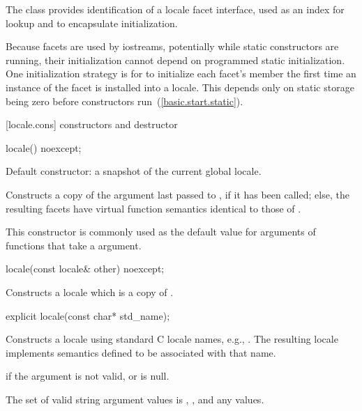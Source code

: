 \pnum
The class  provides identification of a locale facet
interface, used as an index for lookup
and to encapsulate initialization.

\pnum
\begin{note}
Because facets are used by iostreams, potentially while static constructors are
running, their initialization cannot depend on programmed static
initialization.
One initialization strategy is for
to initialize each facet's
member the first time an instance of the facet is installed into a locale.
This depends only on static storage being zero before constructors run~(\ref{basic.start.static}).
\end{note}

[locale.cons]{ constructors and destructor}

%
\begin{itemdecl}
locale() noexcept;
\end{itemdecl}

\begin{itemdescr}
\pnum
Default constructor: a snapshot of the current global locale.

\pnum
\effects
Constructs a copy of the argument last passed to
,
if it has been called; else, the resulting facets have virtual
function semantics identical to those of
.
\begin{note}
This constructor is commonly used as the default value for arguments
of functions that take a
argument.
\end{note}
\end{itemdescr}

%
\begin{itemdecl}
locale(const locale& other) noexcept;
\end{itemdecl}

\begin{itemdescr}
\pnum
\effects
Constructs a locale which is a copy of .
\end{itemdescr}

%
\begin{itemdecl}
explicit locale(const char* std_name);
\end{itemdecl}

\begin{itemdescr}
\pnum
\effects
Constructs a locale using standard C locale names, e.g., .
The resulting locale implements semantics defined to be associated
with that name.

\pnum
\throws
{}
if the argument is not valid, or is null.

\pnum
\remarks
The set of valid string argument values is , ,
and any  values.
\end{itemdescr}

